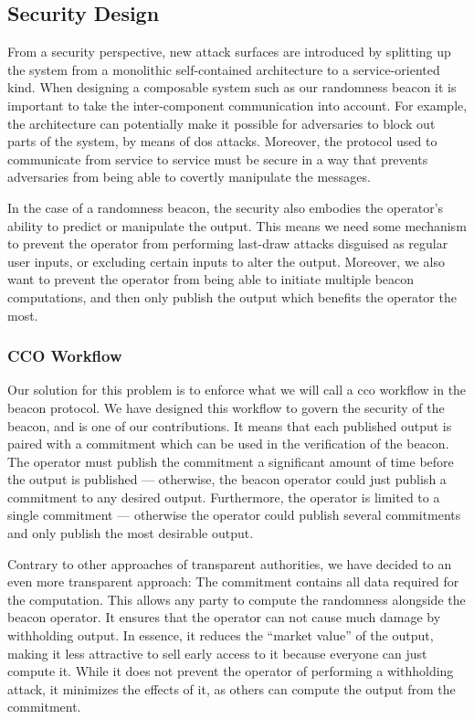 \subsection{Security Design}%
\label{sub:security_design}

From a security perspective, new attack surfaces are introduced by splitting up the system from a monolithic self-contained architecture to a service-oriented kind.
When designing a composable system such as our randomness beacon it is important to take the inter-component communication into account.
For example, the architecture can potentially make it possible for adversaries to block out parts of the system, by means of \gls{dos} attacks.
Moreover, the protocol used to communicate from service to service must be secure in a way that prevents adversaries from being able to covertly manipulate the messages.

In the case of a randomness beacon, the security also embodies the operator's ability to predict or manipulate the output.
This means we need some mechanism to prevent the operator from performing last-draw attacks disguised as regular user inputs, or excluding certain inputs to alter the output.
Moreover, we also want to prevent the operator from being able to initiate multiple beacon computations, and then only publish the output which benefits the operator the most.

\subsubsection{CCO Workflow}
Our solution for this problem is to enforce what we will call a \gls{cco} workflow in the beacon protocol. We have designed this workflow to govern the security of the beacon, and is one of our contributions.
It means that each published output is paired with a commitment which can be used in the verification of the beacon.
The operator must publish the commitment a significant amount of time before the output is published --- otherwise, the beacon operator could just publish a commitment to any desired output.
Furthermore, the operator is limited to a single commitment --- otherwise the operator could publish several commitments and only publish the most desirable output.

Contrary to other approaches of transparent authorities, we have decided to an even more transparent approach: The commitment contains all data required for the computation.
This allows any party to compute the randomness alongside the beacon operator.
It ensures that the operator can not cause much damage by withholding output. In essence, it reduces the \enquote{market value} of the output, making it less attractive to sell early access to it because everyone can just compute it. While it does not prevent the operator of performing a withholding attack, it minimizes the effects of it, as others can compute the output from the commitment.

